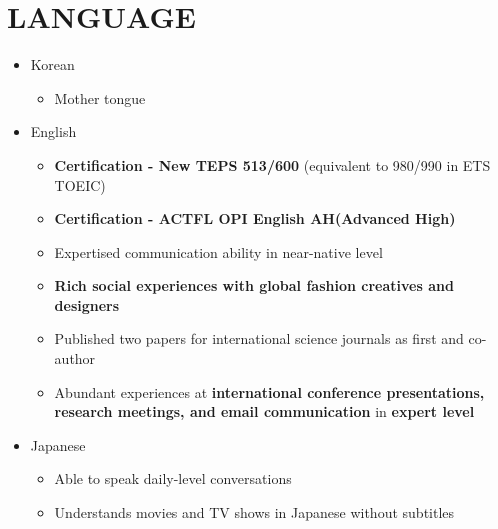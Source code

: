 \documentclass[a4paper,10pt]{extarticle}
\begin{document}

\section*{LANGUAGE}
\begin{itemize}
	\item Korean
	      \begin{itemize}
		      \item Mother tongue
	      \end{itemize}
	\item English
	      \begin{itemize}
		      \item \textbf{Certification - New TEPS 513/600} (equivalent to 980/990 in ETS TOEIC)
		      \item \textbf{Certification - ACTFL OPI English AH(Advanced High)}
		      \item Expertised communication ability in near-native level
		      \item \textbf{Rich social experiences with global fashion creatives and designers}
		      \item Published two papers for international science journals as first and co-author
		      \item Abundant experiences at \textbf{international conference presentations, research meetings, and email communication} in \textbf{expert level}
	      \end{itemize}
	\item Japanese
	      \begin{itemize}
		      \item Able to speak daily-level conversations
		      \item Understands movies and TV shows in Japanese without subtitles
	      \end{itemize}
\end{itemize}
\end{document}
